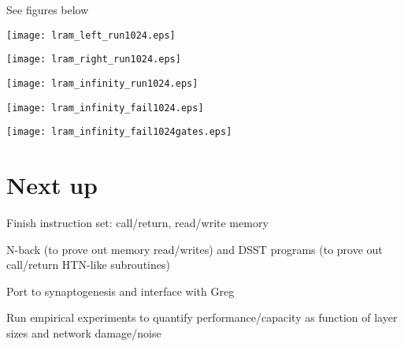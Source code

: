 \documentclass[pdftex,12pt,letterpaper]{article}
\begin{document}
See figures below

\begin{sidewaysfigure}
\centering
\texttt{[image: lram\_left\_run1024.eps]}
\caption{A raster plot showing execution of the program in Table \ref{tbl:aas} when \texttt{TC} contains \texttt{left}.  The x-axis shows time-steps annotated with the currently executing instruction.  The y-axis shows different NVM layers.  Each row of the image shows one neural unit in one layer over time, where brightness indicates firing rate.}
\end{sidewaysfigure}

\begin{sidewaysfigure}
\centering
\texttt{[image: lram\_right\_run1024.eps]}
\caption{A raster plot showing execution of the program in Table \ref{tbl:aas} when \texttt{TC} contains \texttt{right}.}
\end{sidewaysfigure}

\begin{sidewaysfigure}
\centering
\texttt{[image: lram\_infinity\_run1024.eps]}
\caption{A raster plot showing execution of the program in Table \ref{tbl:aas} when \texttt{TC} contains \texttt{null}.}
\end{sidewaysfigure}

\begin{sidewaysfigure}
\centering
\texttt{[image: lram\_infinity\_fail1024.eps]}
\caption{A raster plot showing failed execution of the program in Table \ref{tbl:aas} when \texttt{TC} contains \texttt{null}.  After a couple loop iterations the activity destabilizes.}
\label{fig:fail}
\end{sidewaysfigure}

\begin{sidewaysfigure}
\centering
\texttt{[image: lram\_infinity\_fail1024gates.eps]}
\caption{A close-up of the destabilized memory and gate activity from Fig.\@ \ref{fig:fail}.}
\end{sidewaysfigure}


\section{Next up}

\indent * Finish instruction set: call/return, read/write memory

\noindent * N-back (to prove out memory read/writes) and DSST programs (to prove out call/return HTN-like subroutines)

\noindent * Port to synaptogenesis and interface with Greg

\noindent * Run empirical experiments to quantify performance/capacity as function of layer sizes and network damage/noise
\end{document}
